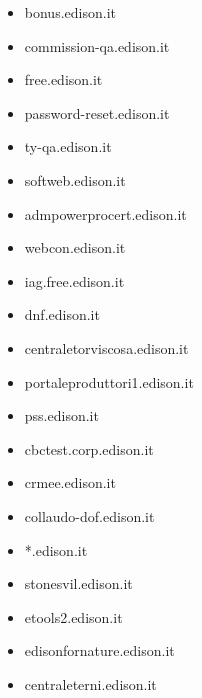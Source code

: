 \documentclass{article}
\begin{document}
\begin{itemize}
            \item bonus.edison.it
        
            \item commission-qa.edison.it
        
            \item free.edison.it
        
            \item password-reset.edison.it
        
            \item ty-qa.edison.it
        
            \item softweb.edison.it
        
            \item admpowerprocert.edison.it
        
            \item webcon.edison.it
        
            \item iag.free.edison.it
        
            \item dnf.edison.it
        
            \item centraletorviscosa.edison.it
        
            \item portaleproduttori1.edison.it
        
            \item pss.edison.it
        
            \item cbctest.corp.edison.it
        
            \item crmee.edison.it
        
            \item collaudo-dof.edison.it
        
            \item *.edison.it
        
            \item stonesvil.edison.it
        
            \item etools2.edison.it
        
            \item edisonfornature.edison.it
        
            \item centraleterni.edison.it
        

\end{itemize}
\end{document}

